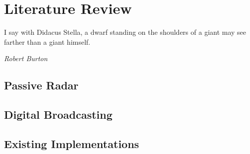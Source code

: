 \documentclass[class=report,11pt,crop=false]{standalone}
\begin{document}
\chapter{Literature Review}
\epigraph{I say with Didacus Stella, a dwarf standing on the shoulders of a giant may see farther than a giant himself.}%
    {\emph{Robert Burton}}

\section{Passive Radar}

\blindmathpaper

\section{Digital Broadcasting}

\blindmathpaper

\section{Existing Implementations}

\blindmathpaper













\ifstandalone

\printnoidxglossary[type=\acronymtype,nonumberlist]
\fi
\end{document}
